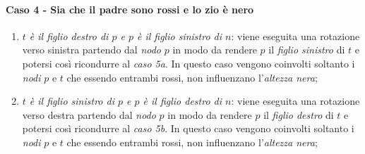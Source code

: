 \newpage
\paragraph{Caso 4 - Sia  che il padre sono rossi e lo zio è nero}
\begin{enumerate}[label=\alph*.]
    \item \emph{$t$ è il figlio destro di $p$ e $p$ è il figlio sinistro di $n$}:
    viene eseguita una rotazione verso sinistra partendo dal \emph{nodo} $p$ in
    modo da rendere $p$ il \emph{figlio sinistro} di $t$ e potersi così ricondurre
    al \emph{caso 5a}. In questo caso vengono coinvolti soltanto i \emph{nodi}
    $p$ e $t$ che essendo entrambi rossi, non influenzano l'\emph{altezza nera};
    \item \emph{$t$ è il figlio sinistro di $p$ e $p$ è il figlio destro di $n$}:
    viene eseguita una rotazione verso destra partendo dal \emph{nodo} $p$ in
    modo da rendere $p$ il \emph{figlio destro} di $t$ e potersi così ricondurre
    al \emph{caso 5b}. In questo caso vengono coinvolti soltanto i \emph{nodi}
    $p$ e $t$ che essendo entrambi rossi, non influenzano l'\emph{altezza nera};
\end{enumerate}

